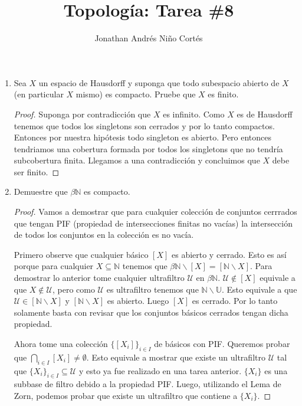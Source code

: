 \documentclass[letter,twoside,12pt]{article}
\title{Topología: Tarea \#8}
\author{Jonathan Andrés Niño Cortés}
\begin{document}
\maketitle
\begin{enumerate}
\item Sea $ X $ un espacio de Hausdorff y suponga que todo subespacio abierto de $ X $ (en particular $ X $ mismo) es compacto. Pruebe que $ X $ es finito.
\begin{proof}
Suponga por contradicción que $ X $ es infinito. Como $ X $ es de Hausdorff tenemos que todos los singletons son cerrados y por lo tanto compactos. Entonces por nuestra hipótesis todo singleton es abierto. Pero entonces tendriamos una cobertura formada por todos los singletons que no tendría subcobertura finita. Llegamos a una contradicción y concluimos que $ X $ debe ser finito.
\end{proof}


\item Demuestre que $ \beta \mathbb{N} $ es compacto.

\begin{proof}
Vamos a demostrar que para cualquier colección de conjuntos cerrrados que tengan PIF (propiedad de intersecciones finitas no vacías) la intersección de todos los conjuntos en la colección es no vacía.

Primero observe que cualquier básico $ [X] $ es abierto y cerrado. Esto es así porque para cualquier $ X \subseteq \mathbb{N} $ tenemos que $ \beta\mathbb{N}\backslash[X] = [\mathbb{N}\backslash X] $. Para demostrar lo anterior tome cualquier ultrafiltro $ \mathcal{U} $ en $ \beta\mathbb{N} $. $ \mathcal{U} \not \in [X] $ equivale a que $ X \not \in \mathcal{U} $, pero como $ \mathcal{U} $ es ultrafiltro tenemos que $ \mathbb{N} \backslash \mathbb{U} $. Esto equivale a que $ \mathcal{U} \in [\mathbb{N} \backslash X] $ y $ [\mathbb{N} \backslash X ] $ es abierto. Luego $ [X] $ es cerrado.
Por lo tanto solamente basta con revisar que los conjuntos básicos cerrados tengan dicha propiedad.

Ahora tome una colección $ \{[X_i]\}_{i \in I} $ de básicos con PIF. Queremos probar que $ \bigcap_{i \in I} [X_i] \not = \emptyset $. Esto equivale a mostrar que existe un ultrafiltro $ \mathcal{U} $ tal que $ \{X_i\}_{i \in I} \subseteq \mathcal{U} $ y esto ya fue realizado en una tarea anterior.
$ \{X_i\} $ es una subbase de filtro debido a la propiedad PIF. Luego, utilizando el Lema de Zorn, podemos probar que existe un ultrafiltro que contiene a $ \{X_i\} $.


\end{proof}
\end{enumerate}
\end{document}
